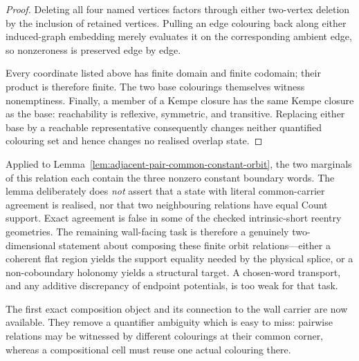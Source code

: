 \begin{proof}
Deleting all four named vertices factors through either two-vertex deletion
by the inclusion of retained vertices.  Pulling an edge colouring back along
either induced-graph embedding merely evaluates it on the corresponding
ambient edge, so nonzeroness is preserved edge by edge.

Every coordinate listed above has finite domain and finite codomain; their
product is therefore finite.  The two base colourings themselves witness
nonemptiness.  Finally, a member of a Kempe closure has the same Kempe
closure as the base: reachability is reflexive, symmetric, and transitive.
Replacing either base by a reachable representative consequently changes
neither quantified colouring set and hence changes no realised overlap
state.
\end{proof}

Applied to Lemma~\ref{lem:adjacent-pair-common-constant-orbit}, the two
marginals of this relation each contain the three nonzero constant boundary
words.  The lemma deliberately does \emph{not} assert that a state with
literal common-carrier agreement is realised, nor that two neighbouring
relations have equal Count support.  Exact agreement is false in some of the
checked intrinsic-short reentry geometries.  The remaining wall-facing task
is therefore a genuinely two-dimensional statement about composing these
finite orbit relations---either a coherent flat region yields the support
equality needed by the physical splice, or a non-coboundary holonomy yields
a structural target.  A chosen-word transport, and any additive discrepancy
of endpoint potentials, is too weak for that task.

The first exact composition object and its connection to the wall carrier
are now available.  They remove a quantifier ambiguity which is easy to miss:
pairwise relations may be witnessed by different colourings at their common
corner, whereas a compositional cell must reuse one actual colouring there.


